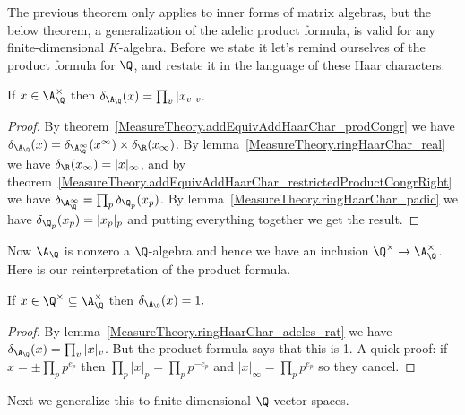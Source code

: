 The previous theorem only applies to inner forms of matrix algebras, but the below theorem,
a generalization of the adelic product formula, is valid for any finite-dimensional
$K$-algebra. Before we state it let's remind ourselves of the product formula for $\Q$,
and restate it in the language of these Haar characters.

\begin{lemma}
  \label{MeasureTheory.ringHaarChar_adeles_rat}
  \leanok
  If $x\in\A_{\Q}^\times$ then $\delta_{\A_{\Q}}(x)=\prod_v|x_v|_v.$
\end{lemma}
\begin{proof}
  \leanok
  By theorem~\ref{MeasureTheory.addEquivAddHaarChar_prodCongr}
  we have $\delta_{\A_{\Q}}(x)=\delta_{\A_{\Q}^\infty}(x^\infty)\times\delta_{\R}(x_\infty)$.
  By lemma~\ref{MeasureTheory.ringHaarChar_real} we have $\delta_{\R}(x_\infty)=|x|_\infty$, and by
  theorem~\ref{MeasureTheory.addEquivAddHaarChar_restrictedProductCongrRight} we have
  $\delta_{\A_{\Q}^\infty}=\prod_p\delta_{\Q_p}(x_p)$. By lemma~\ref{MeasureTheory.ringHaarChar_padic}
  we have $\delta_{\Q_p}(x_p)=|x_p|_p$ and putting everything together we get the result.
\end{proof}

Now $\A_{\Q}$ is nonzero a $\Q$-algebra and hence we have an inclusion $\Q^\times\to\A_{\Q}^\times$.
Here is our reinterpretation of the product formula.

\begin{lemma}
  \label{MeasureTheory.ringHaarChar_adeles_units_rat_eq_one}
  \leanok
  If $x\in\Q^\times\subseteq\A_{\Q}^\times$ then $\delta_{\A_{\Q}}(x)=1.$
\end{lemma}
\begin{proof}
  \leanok
  By lemma~\ref{MeasureTheory.ringHaarChar_adeles_rat} we have $\delta_{\A_{\Q}}(x)=\prod_v|x|_v$.
  But the product formula says that this is 1.
  A quick proof: if $x=\pm\prod_pp^{e_p}$ then $\prod_p|x|_p=\prod_pp^{-e_p}$
  and $|x|_\infty=\prod_pp^{e_p}$ so they cancel.
\end{proof}

  Next we generalize this to finite-dimensional $\Q$-vector spaces.

